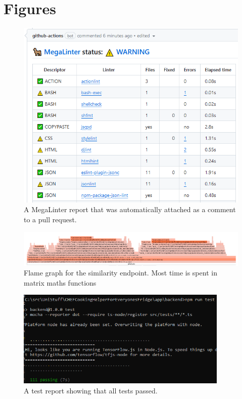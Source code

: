 \documentclass[11pt, twoside, a4paper]{report}
\newcommand*\cleartoleftpage{%
  \clearpage
  \ifodd\value{page}\hbox{}\newpage\fi
}
\begin{document}
\cleartoleftpage\section{Figures}
\begin{figure}[h!]
    \centering
    \caption{\label{fig:metalinter_report}A MegaLinter report that was automatically attached as a comment to a pull request.}
    \includegraphics[width=\textwidth]{figures/megalinter_report.png}
\end{figure}

\begin{figure}
    \centering
    \caption{\label{fig:similarity_flamegraph}Flame graph for the similarity endpoint. Most time is spent in matrix maths functions}
    \includegraphics[angle=90,height=0.9\textheight]{figures/similarity_flamegraph.png}
\end{figure}

\begin{figure}
    \centering
    \caption{\label{fig:test_report}A test report showing that all tests passed.}
    \includegraphics[width=0.9\textwidth]{figures/test_report.png}
\end{figure}
\end{document}
